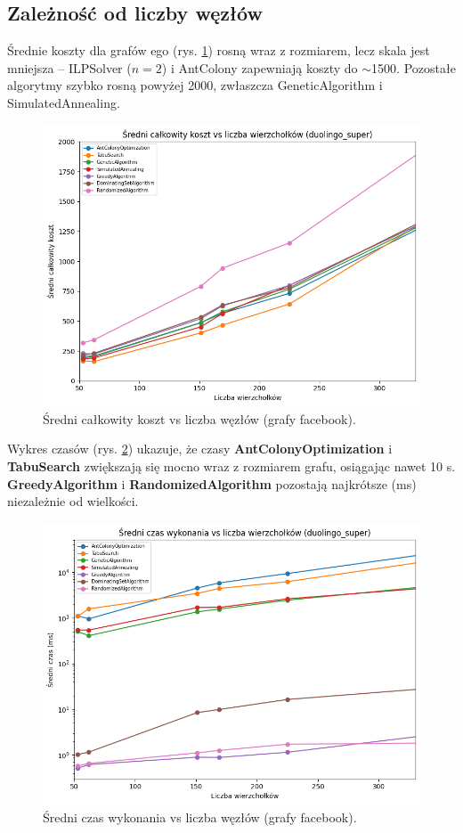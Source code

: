 \subsection{Zależność od liczby węzłów}

Średnie koszty dla grafów ego (rys. \ref{fig:facebook_cost_vs_nodes}) rosną wraz z rozmiarem, lecz skala jest mniejsza -- ILPSolver ($n = 2$) i AntColony zapewniają koszty do $\sim$1500. Pozostałe algorytmy szybko rosną powyżej 2000, zwłaszcza GeneticAlgorithm i SimulatedAnnealing.

\begin{figure}[H]
  \centering
  \includegraphics[width=0.7\linewidth]{assets/figures/facebook_cost_vs_nodes.png}
  \caption{Średni całkowity koszt vs liczba węzłów (grafy facebook).}
  \label{fig:facebook_cost_vs_nodes}
\end{figure}

Wykres czasów (rys. \ref{fig:facebook_time_vs_nodes}) ukazuje, że czasy \textbf{AntColonyOptimization} i \textbf{TabuSearch} zwiększają się mocno wraz z rozmiarem grafu, osiągając nawet 10 s. \textbf{GreedyAlgorithm} i \textbf{RandomizedAlgorithm} pozostają najkrótsze (ms) niezależnie od wielkości.

\begin{figure}[H]
  \centering
  \includegraphics[width=0.7\linewidth]{assets/figures/facebook_time_vs_nodes.png}
  \caption{Średni czas wykonania vs liczba węzłów (grafy facebook).}
  \label{fig:facebook_time_vs_nodes}
\end{figure}

